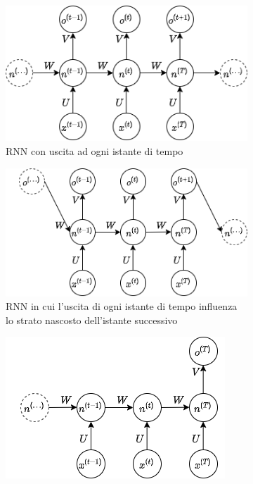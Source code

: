 \documentclass[../../main.tex]{subfiles}
\begin{document}
\begin{figure}[H]
    \centering
    \begin{subfigure}[t]{0.49\textwidth}
        \centering
        \includegraphics[width = \textwidth]{immagini/4_2/recnet2.png}
        \caption{RNN con uscita ad ogni istante di tempo}
        \label{fig:RNNArch1}
    \end{subfigure}
    \begin{subfigure}[t]{0.49\textwidth}
        \centering
        \includegraphics[width = \textwidth]{immagini/4_2/recnet.png}      
        \caption{RNN in cui l'uscita di ogni istante di tempo influenza lo strato nascosto dell'istante successivo}  
        \label{fig:RNNArch2}
    \end{subfigure}
    \begin{subfigure}[t]{0.49\textwidth}
        \centering
        \includegraphics[width = \textwidth]{immagini/4_2/recnet3.png}  

\end{subfigure}
\end{figure}
\end{document}
